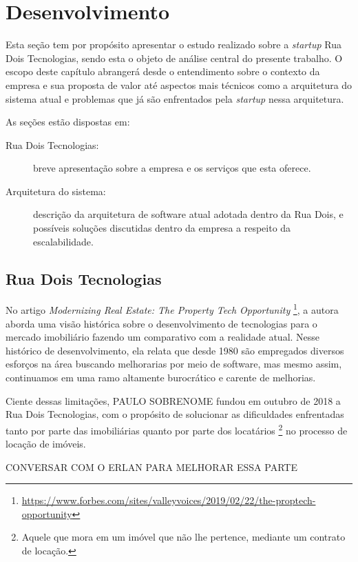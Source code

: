 \chapter{Desenvolvimento}

Esta seção tem por propósito apresentar o estudo realizado sobre a
\textit{startup} Rua Dois Tecnologias, sendo esta o objeto de análise
central do presente trabalho. O escopo deste capítulo abrangerá desde
o entendimento sobre o contexto da empresa e sua proposta de valor
até aspectos mais técnicos como a arquitetura do sistema atual e
problemas que já são enfrentados pela \textit{startup} nessa arquitetura.

  As seções estão dispostas em:

  \begin{description}
    \item[Rua Dois Tecnologias:] breve apresentação sobre a empresa e os
      serviços que esta oferece.
    \item[Arquitetura do sistema:] descrição da arquitetura de software atual
      adotada dentro da Rua Dois, e possíveis soluções discutidas dentro da
      empresa a respeito da escalabilidade.
  \end{description}

\section{Rua Dois Tecnologias}

No artigo \textit{Modernizing Real Estate: The Property Tech Opportunity}
\footnote{\url{https://www.forbes.com/sites/valleyvoices/2019/02/22/the-proptech-opportunity}},
a autora  aborda uma visão histórica sobre o desenvolvimento
de tecnologias para o mercado imobiliário fazendo um comparativo com a realidade atual.
Nesse histórico de desenvolvimento, ela relata que desde 1980 são empregados
diversos esforços na área buscando melhorarias por meio de software, mas mesmo
assim, continuamos em uma ramo altamente burocrático e carente de melhorias.

Ciente dessas limitações, PAULO SOBRENOME fundou em outubro de 2018 a
Rua Dois Tecnologias, com o propósito de solucionar as dificuldades
enfrentadas tanto por parte das imobiliárias quanto por parte dos locatários
\footnote{Aquele que mora em um imóvel que não lhe pertence, mediante um
contrato de locação.} no processo de locação de imóveis.

CONVERSAR COM O ERLAN PARA MELHORAR ESSA PARTE


